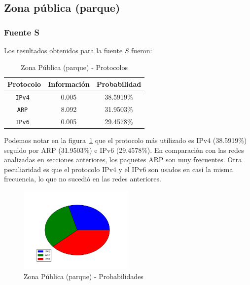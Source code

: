 \documentclass[final,inline,narroweqnarray,a4paper]{ieee}
\begin{document}
\subsection{Zona pública (parque)}
\subsubsection{Fuente S}

Los resultados obtenidos para la fuente $S$ fueron:

\begin{table}[H]
    \begin{center}
        \begin{tabular}{|c|c|c|}
            \hline
            \textbf{Protocolo} & \textbf{Información} & \textbf{Probabilidad} \\ \hline
            \texttt{IPv4      }& 0.005        & 38.5919\%    \\ \hline
            \texttt{ARP       }& 8.092        & 31.9503\%     \\ \hline
            \texttt{IPv6      }& 0.005        & 29.4578\%    \\ \hline
        \end{tabular}
        \caption{Zona Pública (parque) - Protocolos}
        \label{table:labosDcS}
    \end{center}
\end{table} 

Podemos notar en la figura~\ref{torta:parqueS} que el protocolo más utilizado es IPv4 (38.5919\%) seguido por ARP (31.9503\%) e IPv6 (29.4578\%). En comparación con las redes analizadas en secciones anteriores, los paquetes ARP son muy frecuentes. Otra peculiaridad es que el protocolo IPv4 y el IPv6 son usados en casi la misma frecuencia, lo que no sucedió en las redes anteriores.

\begin{figure}[H]
    \begin{center}
        \includegraphics[width=0.5\textwidth]{plot/parqueS-pie.png}
        \caption{Zona Pública (parque) - Probabilidades}
        \label{torta:parqueS}
    \end{center}
\end{figure}
\end{document}
